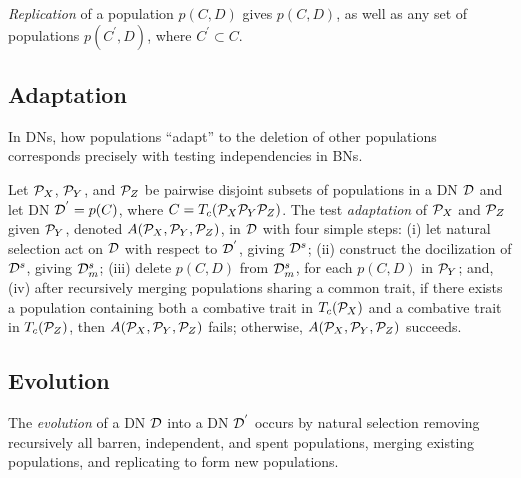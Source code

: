 		
		\emph{Replication} of a population $p(C,D)$ gives $p(C,D)$, as well as any set of populations $p(C^{'}, D)$, where $C^{'} \subset C$.
		

\subsection{Adaptation}
\label{subsec:adaptation}


In DNs, how populations ``adapt'' to the deletion of other populations corresponds precisely with testing independencies in BNs.

Let ${\cal{P}}_X$, ${\cal{P}}_Y$, and ${\cal{P}}_Z$ be pairwise disjoint subsets of populations in a DN $\cal D$ and let DN ${\cal{D}}^{'} = {p(C)}$, where $C = T_c({\cal{P}}_X {\cal{P}}_Y {\cal{P}}_Z)$. 
The test \emph{adaptation} of ${\cal{P}}_X$ and ${\cal{P}}_Z$ given ${\cal{P}}_Y$, denoted $A({\cal{P}}_X,{\cal{P}}_Y,{\cal{P}}_Z)$, in $\cal D$ with four simple steps:
(i) let natural selection act on $\cal{D}$ with respect to ${\cal{D}}^{'}$, giving ${\cal{D}}^{s}$;
(ii) construct the docilization of ${\cal{D}}^{s}$, giving ${\cal{D}}^s_m$;
(iii) delete $p(C,D)$ from ${\cal{D}}^s_m$, for each $p(C,D)$ in ${\cal{P}}_Y$; and,
(iv) after recursively merging populations sharing a common trait, if there exists a population containing both a combative trait in $T_c({\cal{P}}_X)$ and a combative trait in $T_c({\cal{P}}_Z)$, then $A({\cal{P}}_X,{\cal{P}}_Y,{\cal{P}}_Z)$ fails; otherwise, $A({\cal{P}}_X,{\cal{P}}_Y,{\cal{P}}_Z)$ succeeds.


\subsection{Evolution}
\label{subsec:evolution}


The \emph{evolution} of a DN $\cal{D}$ into a DN ${\cal{D}}^{'}$ occurs by natural selection removing recursively all barren, independent, and spent populations, merging existing populations, and replicating to form new populations.


